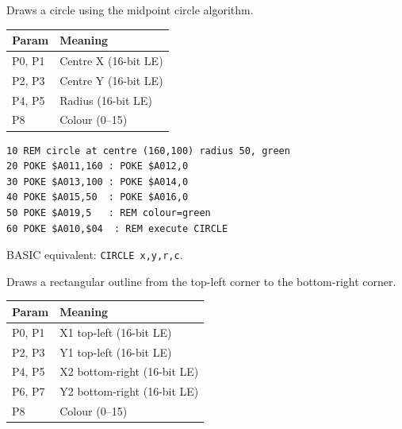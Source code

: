 

Draws a circle using the midpoint circle algorithm.

\begin{center}
\small
\begin{tabular}{@{}ll@{}}
\toprule
\textbf{Param} & \textbf{Meaning} \\
\midrule
P0, P1 & Centre X (16-bit LE) \\
P2, P3 & Centre Y (16-bit LE) \\
P4, P5 & Radius (16-bit LE) \\
P8     & Colour (0--15) \\
\bottomrule
\end{tabular}
\end{center}

\begin{lstlisting}
10 REM circle at centre (160,100) radius 50, green
20 POKE $A011,160 : POKE $A012,0
30 POKE $A013,100 : POKE $A014,0
40 POKE $A015,50  : POKE $A016,0
50 POKE $A019,5   : REM colour=green
60 POKE $A010,$04  : REM execute CIRCLE
\end{lstlisting}

\begin{notebox}
BASIC equivalent: \texttt{CIRCLE x,y,r,c}.
\end{notebox}



Draws a rectangular outline from the top-left corner to the bottom-right
corner.

\begin{center}
\small
\begin{tabular}{@{}ll@{}}
\toprule
\textbf{Param} & \textbf{Meaning} \\
\midrule
P0, P1 & X1 top-left (16-bit LE) \\
P2, P3 & Y1 top-left (16-bit LE) \\
P4, P5 & X2 bottom-right (16-bit LE) \\
P6, P7 & Y2 bottom-right (16-bit LE) \\
P8     & Colour (0--15) \\
\bottomrule
\end{tabular}
\end{center}

